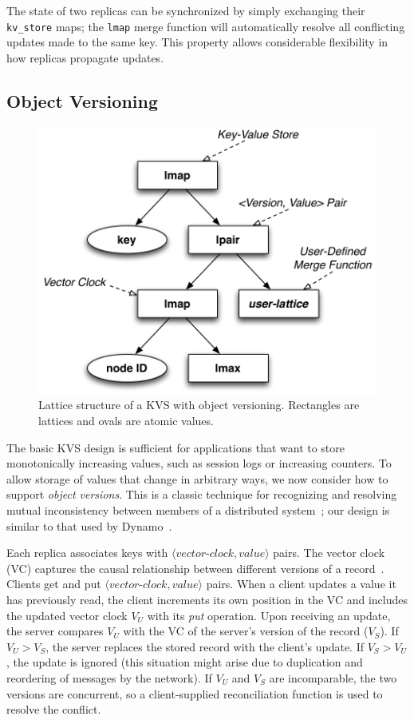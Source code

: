 The state of two replicas can be synchronized by simply exchanging their
\texttt{kv\_store} maps; the \texttt{lmap} merge function will automatically
resolve all conflicting updates made to the same key. This property allows
considerable flexibility in how replicas propagate updates.

\subsection{Object Versioning}
\label{sec:kvs-versions}
\begin{figure}[t]
\centering
\includegraphics[width=0.8\linewidth]{fig/kvs-vc-lattice.pdf}
\caption{Lattice structure of a KVS with object versioning. Rectangles are
  lattices and ovals are atomic values.}
\label{fig:kvs-vc-lattices}
\end{figure}

The basic KVS design is sufficient for applications that want to store
monotonically increasing values, such as session logs or increasing counters. To
allow storage of values that change in arbitrary ways, we now consider how to
support \emph{object versions}. This is a classic technique for recognizing and resolving
mutual inconsistency between members of a distributed system~\cite{Parker1983};
our design is similar to that used by Dynamo~\cite{DeCandia2007}.

Each replica associates keys with
$\langle\textit{vector-clock},\textit{value}\rangle$ pairs. The vector clock
(VC) captures the causal relationship between different versions of a
record~\cite{Fidge1988,DeCandia2007}. Clients get and put
$\langle\textit{vector-clock},\textit{value}\rangle$ pairs. When a client
updates a value it has previously read, the client increments its own position
in the VC and includes the updated vector clock $V_U$ with its \emph{put}
operation. Upon receiving an update, the server compares $V_U$ with the VC of
the server's version of the record ($V_S$). If $V_U > V_S$, the server replaces
the stored record with the client's update. If $V_S > V_U$, the update is
ignored (this situation might arise due to duplication and reordering of
messages by the network). If $V_U$ and $V_S$ are incomparable, the two versions
are concurrent, so a client-supplied reconciliation function is used to resolve
the conflict.

